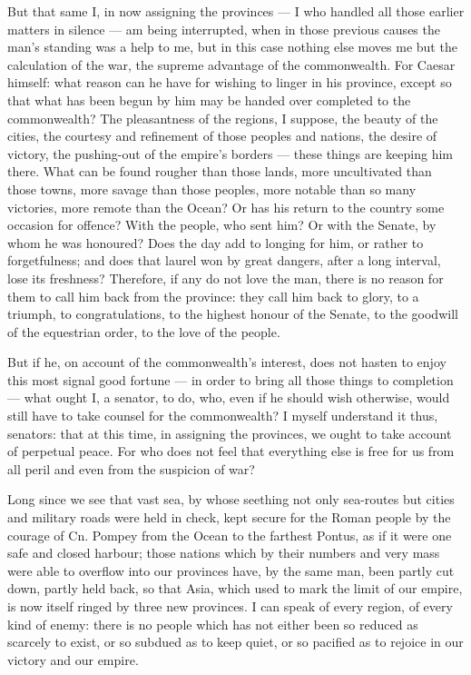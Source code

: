  But that same I, in now assigning the provinces --- I who handled all those earlier matters in silence --- am being interrupted, when in those previous causes the man's standing was a help to me, but in this case nothing else moves me but the calculation of the war, the supreme advantage of the commonwealth. For Caesar himself: what reason can he have for wishing to linger in his province, except so that what has been begun by him may be handed over completed to the commonwealth? The pleasantness of the regions, I suppose, the beauty of the cities, the courtesy and refinement of those peoples and nations, the desire of victory, the pushing-out of the empire's borders --- these things are keeping him there. What can be found rougher than those lands, more uncultivated than those towns, more savage than those peoples, more notable than so many victories, more remote than the Ocean? Or has his return to the country some occasion for offence? With the people, who sent him? Or with the Senate, by whom he was honoured? Does the day add to longing for him, or rather to forgetfulness; and does that laurel won by great dangers, after a long interval, lose its freshness? Therefore, if any do not love the man, there is no reason for them to call him back from the province: they call him back to glory, to a triumph, to congratulations, to the highest honour of the Senate, to the goodwill of the equestrian order, to the love of the people.

 But if he, on account of the commonwealth's interest, does not hasten to enjoy this most signal good fortune --- in order to bring all those things to completion --- what ought I, a senator, to do, who, even if he should wish otherwise, would still have to take counsel for the commonwealth? I myself understand it thus, senators: that at this time, in assigning the provinces, we ought to take account of perpetual peace. For who does not feel that everything else is free for us from all peril and even from the suspicion of war?

 Long since we see that vast sea, by whose seething not only sea-routes but cities and military roads were held in check, kept secure for the Roman people by the courage of Cn. Pompey from the Ocean to the farthest Pontus, as if it were one safe and closed harbour; those nations which by their numbers and very mass were able to overflow into our provinces have, by the same man, been partly cut down, partly held back, so that Asia, which used to mark the limit of our empire, is now itself ringed by three new provinces. I can speak of every region, of every kind of enemy: there is no people which has not either been so reduced as scarcely to exist, or so subdued as to keep quiet, or so pacified as to rejoice in our victory and our empire.

